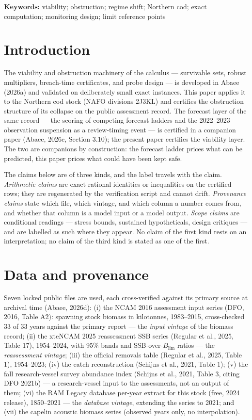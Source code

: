 \documentclass[10pt,twocolumn]{article}
\theoremstyle{plain}
\theoremstyle{remark}
\begin{document}
\textbf{Keywords:} viability; obstruction; regime shift; Northern cod;
exact computation; monitoring design; limit reference points

\section{Introduction}\label{intro}

The viability and obstruction machinery of the calculus --- survivable
sets, robust multipliers, breach-time certificates, and probe design ---
is developed in Abaee (2026a) and validated on deliberately small exact
instances. This paper applies it to the Northern cod stock (NAFO
divisions 2J3KL) and certifies the obstruction structure of its
collapse on the public assessment record. The forecast layer of the
same record --- the scoring of competing forecast ladders and the
2022--2023 observation suspension as a review-timing event --- is
certified in a companion paper (Abaee, 2026c, Section 3.10); the
present paper certifies the viability layer. The two are companions by
construction: the forecast ladder prices what can be predicted, this
paper prices what could have been kept safe.

The claims below are of three kinds, and the label travels with the
claim. \emph{Arithmetic claims} are exact rational identities or
inequalities on the certified rows; they are regenerated by the
verification script and cannot drift. \emph{Provenance claims} state
which file, which vintage, and which column a number comes from, and
whether that column is a model input or a model output. \emph{Scope
claims} are conditional readings --- stress bounds, sustained
hypotheticals, design critiques --- and are labelled as such where
they appear. No claim of the first kind rests on an interpretation; no
claim of the third kind is stated as one of the first.

\section{Data and provenance}\label{data}

Seven locked public files are used, each cross-verified against its
primary source at archival time (Abaee, 2026d): (i) the NCAM 2016
assessment input series (DFO, 2016, Table A2): spawning stock biomass
in kilotonnes, 1983--2015, cross-checked 33 of 33 years against the
primary report --- the \emph{input vintage} of the biomass record;
(ii) the xteNCAM 2025 reassessment SSB series (Regular et al., 2025,
Table 17), 1954--2024, with 95\% bands and SSB-over-\(B_{\mathrm{lim}}\)
ratios --- the \emph{reassessment vintage}; (iii) the official
removals table (Regular et al., 2025, Table 1), 1954--2023; (iv) the
catch reconstruction (Schijns et al., 2021, Table 1); (v) the fall
research-vessel survey abundance index (Schijns et al., 2021, Table 3,
citing DFO 2021b) --- a research-vessel input to the assessments, not
an output of them; (vi) the RAM Legacy database per-year extract for
this stock (free, 2024 release), 1850--2021 --- the \emph{database
vintage}, extending the series to 2021; and (vii) the capelin acoustic
biomass series (observed years only, no interpolation).
\end{document}
